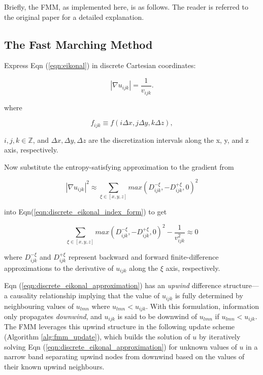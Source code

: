 		Briefly, the FMM, as implemented here, is as follows. The reader is referred to the original paper \cite{Sethian1996} for a detailed explanation.
		\par
		
	\subsection{The Fast Marching Method}
		Express Eqn (\ref{eqn:eikonal}) in discrete Cartesian coordinates:
		
		\begin{equation}
			\label{eqn:discrete_eikonal_index_form}
			\left|\nabla u_{ijk}\right| = \frac{1}{v_{ijk}}.
		\end{equation}
	
		\noindent where
	
		\begin{equation}
			f_{ijk} \equiv f\left(i\Delta x, j\Delta y, k\Delta z\right),
		\end{equation}
		
		\noindent $i, j, k \in \mathbb{Z}$, and $\Delta x, \Delta y, \Delta z$ are the discretization intervals along the x, y, and z axis, respectively.
		\par
		
		Now substitute the entropy-satisfying approximation to the gradient from 
		
		\begin{equation}
			\label{eqn:gradient_approximation}
			\left|\nabla u_{ijk}\right| ^2 \approx 
			\sum_{\xi \in \left[x, y, z\right]} max\left(D^{-\xi}_{ijk}, -D^{+\xi}_{ijk}, 0 \right)^2
		\end{equation}
		
		\noindent into Eqn(\ref{eqn:discrete_eikonal_index_form}) to get
		
		\begin{equation}
			\label{eqn:discrete_eikonal_approximation}
			\sum_{\xi \in \left[x, y, z\right]} max\left(D^{-\xi}_{ijk}, -D^{+\xi}_{ijk}, 0 \right)^2 - \frac{1}{v^2_{ijk}} \approx 0
		\end{equation}
		
		\noindent where $D^{-\xi}_{ijk}$ and $D^{+\xi}_{ijk}$ represent backward and forward finite-difference approximations to the derivative of $u_{ijk}$ along the $\xi$ axis, respectively.
		\par
		
		Eqn (\ref{eqn:discrete_eikonal_approximation}) has an \textit{upwind} difference structure---a causality relationship implying that the value of $u_{ijk}$ is fully determined by neighbouring values of $u_{lmn}$ where $u_{lmn} < u_{ijk}$. With this formulation, information only propagates \textit{downwind}, and $u_{ijk}$ is said to be downwind of $u_{lmn}$ if $u_{lmn} < u_{ijk}$. The FMM leverages this upwind structure in the following update scheme (Algorithm \ref{alg:fmm_update}), which builds the solution of $u$ by iteratively solving Eqn (\ref{eqn:discrete_eikonal_approximation}) for unknown values of $u$ in a narrow band separating upwind nodes from downwind based on the values of their known upwind neighbours.
		\par
		
